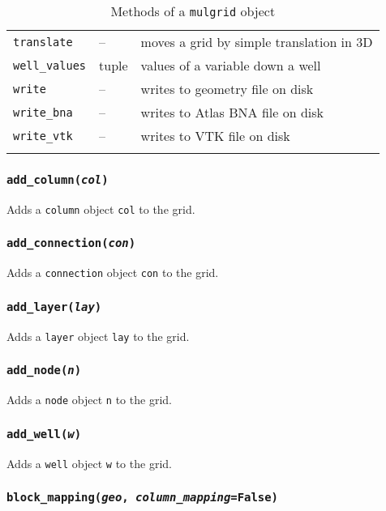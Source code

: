 \begin{center}
\begin{longtable}{|l|l|p{70mm}|}
  \texttt{translate} & -- & moves a grid by simple translation in 3D\\
  \texttt{well\_values} & tuple & values of a variable down a well\\
  \texttt{write} & -- & writes to geometry file on disk\\
  \texttt{write\_bna} & -- & writes to Atlas BNA file on disk\\ 
  \texttt{write\_vtk} &  -- & writes to VTK file on disk\\
  \hline
  \caption{Methods of a \texttt{mulgrid} object}
  \label{tb:mulgrid_methods}
\end{longtable}
\end{center}

\subsubsection{\texttt{add\_column(\emph{col})}}

Adds a \texttt{column} object \texttt{col} to the grid.

\subsubsection{\texttt{add\_connection(\emph{con})}}

Adds a \texttt{connection} object \texttt{con} to the grid.

\subsubsection{\texttt{add\_layer(\emph{lay})}}

Adds a \texttt{layer} object \texttt{lay} to the grid.

\subsubsection{\texttt{add\_node(\emph{n})}}

Adds a \texttt{node} object \texttt{n} to the grid.

\subsubsection{\texttt{add\_well(\emph{w})}}

Adds a \texttt{well} object \texttt{w} to the grid.

\subsubsection{\texttt{block\_mapping(\emph{geo}, \emph{column\_mapping}=\texttt{False})}}

